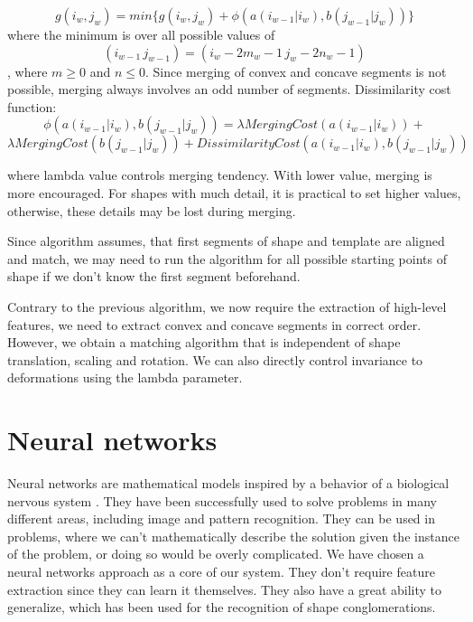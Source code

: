 \begin{description}
\begin{equation*}
g(i_{w},j_{w}) = min\{g(i_{w},j_{w}) + \phi(a(i_{w-1}|i_{w}), b(j_{w-1}|j_{w}))\}
\end{equation*}
where the minimum is over all possible values of 
\begin{equation*}
(i_{w-1}\,j_{w-1})  =  (i_{w} - 2m_{w} -1\, j_{w} - 2n_{w} - 1)
\end{equation*}
, where $m \geq 0$ and $n \leq 0$.
Since merging of convex and concave segments is not possible, merging always involves an odd number of segments. Dissimilarity cost function: 
\begin{equation*}
\phi(a(i_{w-1}|i_{w}), b(j_{w-1}|j_{w}))  =  \lambda MergingCost(a(i_{w-1}|i_{w}))  +
\end{equation*}
\begin{equation*} 
\lambda MergingCost(b(j_{w-1}|j_{w}))  +  DissimilarityCost(a(i_{w-1}|i_{w}), b(j_{w-1}|j_{w}))
\end{equation*}

where lambda value controls merging tendency. With lower value, merging is more encouraged. For shapes with much detail, it is practical to set higher values, otherwise, these details may be lost during merging. 

Since algorithm assumes, that first segments of shape and template are aligned and match, we may need to run the algorithm for all possible starting points of shape if we don't know the first segment beforehand.

Contrary to the previous algorithm, we now require the extraction of high-level features, we need to extract convex and concave segments in correct order. However, we obtain a matching algorithm that is independent of shape translation, scaling and rotation. We can also directly control invariance to deformations using the lambda parameter.

\chapter{Neural networks}
Neural networks are mathematical models inspired by a behavior of a biological nervous system \cite{bishop}. They have been successfully used to solve problems in many different areas, including image and pattern recognition. They can be used in problems, where we can't mathematically describe the solution given the instance of the problem, or doing so would be overly complicated. We have chosen a neural networks approach as a core of our system. They don't require feature extraction since they can learn it themselves. They also have a great ability to generalize, which has been used for the recognition of shape conglomerations.


\end{description}
